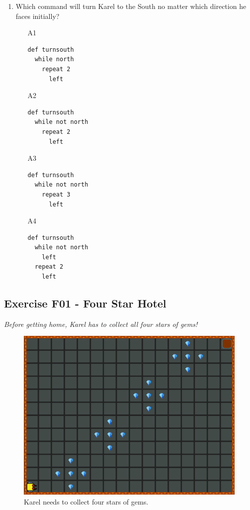 \documentclass[article,A4,12pt]{llncs}
\begin{document}
{{{{\begin{enumerate}
\begin{enumerate}
\item[A3] 
\begin{verbatim}
def emptybag
  while empty
    put
\end{verbatim}
\item[A4] 
\begin{verbatim}
def emptybag
  while not empty
    put
\end{verbatim}
\end{enumerate}
\item Which command will turn Karel to the South no matter 
      which direction he faces initially?
\begin{enumerate}
\item[A1] 
\begin{verbatim}
def turnsouth
  while north
    repeat 2
      left
\end{verbatim}
\item[A2] 
\begin{verbatim}
def turnsouth
  while not north
    repeat 2
      left
\end{verbatim}
\item[A3] 
\begin{verbatim}
def turnsouth
  while not north
    repeat 3
      left
\end{verbatim}
\item[A4] 
\begin{verbatim}
def turnsouth
  while not north
    left
  repeat 2
    left
\end{verbatim}
\end{enumerate}
\end{enumerate}

\newpage
\subsection{Exercise F01 - Four Star Hotel}

{\em Before getting home, Karel has to collect all four stars of gems!}


\begin{figure}[!ht]
\begin{center}
\includegraphics[height=0.4\textwidth]{img/f01.png}
\end{center}
\vspace{-4mm}
\caption{Karel needs to collect four stars of gems.}
\label{fig:f01}
\vspace{-10mm}
\end{figure}
\noindent

}}}}
\end{document}
